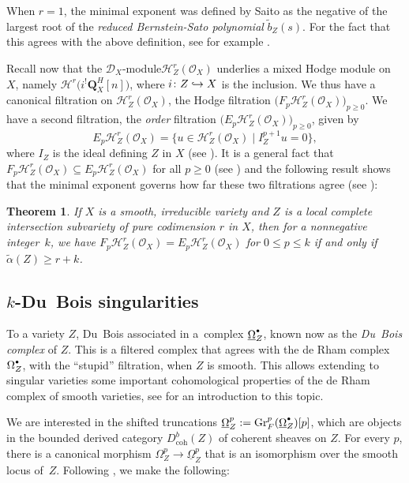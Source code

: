 \documentclass[JEP,XML,SOM,Unicode]{cedram}
\newcommand\hto{\mathrel{\lhook\joinrel\to}}
\newcommand{\sbullet}{{\scriptscriptstyle\bullet}}
\newcommand{\csbullet}{{\raisebox{1pt}{$\sbullet$}}}
\newcommand{\DXmodule}{$\cD_X$\nobreakdash-mod\-ule\xspace}
\theoremstyle{plain}
\newtheorem{thm}{Theorem}[section]
\theoremstyle{definition}
\newcommand\Q{{\mathbf Q}}
\newcommand\cD{\mathcal{D}}
\newcommand\cH{\mathcal{H}}
\newcommand\cO{\mathcal{O}}
\newcommand\cH{\mathcal{H}}
\newcommand\cO{\mathcal{O}}
\newcommand\gr{\mathrm{Gr}}
\begin{document}
When $r=1$, the minimal exponent was defined by Saito \cite{Saito_microlocal} as the negative of the largest root of the \emph{reduced Bernstein-Sato polynomial}
$\widetilde{b}_Z(s)$. For the fact that this agrees with the above definition, see for example \cite[Lem.\,5.3 and Cor.\,C]{MP5}.

Recall now that the \DXmodule $\cH^r_Z(\cO_X)$ underlies a mixed Hodge module on~$X$, namely $\cH^r\big(i^!\Q_X^H[n]\big)$, where
$i\colon Z\hto X$ is the inclusion. We thus have a canonical filtration on $\cH^r_Z(\cO_X)$, the Hodge filtration $\big(F_p\cH^r_Z(\cO_X)\big)_{p\geq 0}$.
We have a second filtration, the \emph{order} filtration $\big(E_p\cH^r_Z(\cO_X)\big)_{p\geq 0}$, given by
\[E_p\cH^r_Z(\cO_X)=\big\{u\in\cH^r_Z(\cO_X)\mid I_Z^{p+1}u=0\big\},\]
where $I_Z$ is the ideal defining $Z$ in $X$ (see \cite[Prop.\,3.11]{MP1}).
It is a general fact that $F_p\cH^r_Z(\cO_X)\subseteq E_p\cH^r_Z(\cO_X)$ for all $p\geq 0$
(see \cite[Prop.\,3.4]{MP1}) and the following result shows that the minimal exponent governs how far these two filtrations agree
(see \cite[Th.\,1.3]{CDMO}):

\begin{thm}\label{thm_local_coho}
If $X$ is a smooth, irreducible variety and $Z$ is a local complete intersection subvariety of pure codimension $r$ in $X$, then for a nonnegative integer~$k$, we have
$F_p\cH^r_Z(\cO_X)=E_p\cH^r_Z(\cO_X)$ for $0\leq p\leq k$ if and only if $\widetilde{\alpha}(Z)\geq r+k$.
\end{thm}

\subsection{$k$-Du~Bois singularities}\label{section_k_DuBois}
To a variety $Z$, Du~Bois associated in \cite{DuBois} a~complex $\underline{\Omega}_Z^{\csbullet}$, known now as the
\emph{Du~Bois complex} of $Z$. This is a filtered complex that agrees with the de Rham complex $\Omega_Z^{\csbullet}$, with the ``stupid'' filtration, when $Z$ is smooth.
This allows extending to singular varieties some important cohomological properties of the de Rham complex of smooth varieties, see \cite[Ch.\,7.3]{PetersSteenbrink}
for an introduction to this topic.

We are interested in the shifted truncations $\underline{\Omega}_Z^p:=\gr_F^p(\underline{\Omega}_Z^{\csbullet})[p]$, which are objects in the bounded derived category
$D^b_\mathrm{coh}(Z)$ of coherent sheaves on $Z$.
For every $p$, there is a canonical morphism $\Omega_Z^p\to \underline{\Omega}_Z^p$ that is an isomorphism over the smooth locus of~$Z$. Following
\cite{Saito_et_al}, we make the following:
\end{document}
